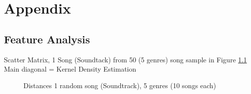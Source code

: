 \documentclass[a4paper,oneside,12pt]{report}
\begin{document}



\chapter{Appendix}

\section{Feature Analysis}

\noindent Scatter Matrix, 1 Song (Soundtack) from 50 (5 genres) song sample in Figure \ref{fig:corr8}\\
Main diagonal = Kernel Density Estimation\\

\begin{figure}[htbp]
	\centering
	\caption{Distances 1 random song (Soundtrack), 5 genres (10 songs each)}
	\label{fig:corr8}
\end{figure}
\end{document}

